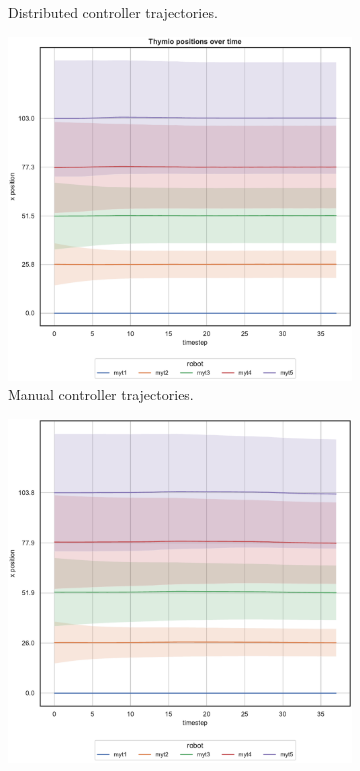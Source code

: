 \begin{figure}[!htb]
\begin{center}
\begin{subfigure}[h]{0.49\textwidth}
			\caption{Distributed controller trajectories.}
		\end{subfigure}
	\end{center}
	\begin{center}
		\begin{subfigure}[h]{0.49\textwidth}
			\centering			
			\includegraphics[width=.9\textwidth]{contents/images/net-d12/position-overtime-manual}%
			\caption{Manual controller trajectories.}
		\end{subfigure}
		\hfill
		\begin{subfigure}[h]{0.49\textwidth}
			\centering
			\includegraphics[width=.9\textwidth]{contents/images/net-c12/position-overtime-learned_communication}

\end{subfigure}
\end{center}
\end{figure}
